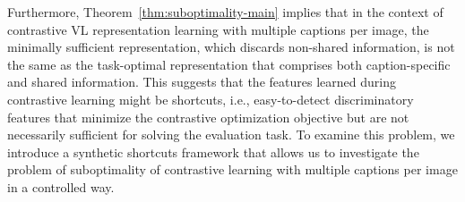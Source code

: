 Furthermore, Theorem~\ref{thm:suboptimality-main} implies that in the context of contrastive \ac{VL} representation learning with multiple captions per image, the minimally sufficient representation, which discards non-shared information, is not the same as the task-optimal representation that comprises both caption-specific and shared information.  
This suggests that the features learned during contrastive learning might be shortcuts, i.e., easy-to-detect discriminatory features that minimize the contrastive optimization objective but are not necessarily sufficient for solving the evaluation task.
To examine this problem, we introduce a synthetic shortcuts framework that allows us to investigate the problem of suboptimality of contrastive learning with multiple captions per image in a controlled way.